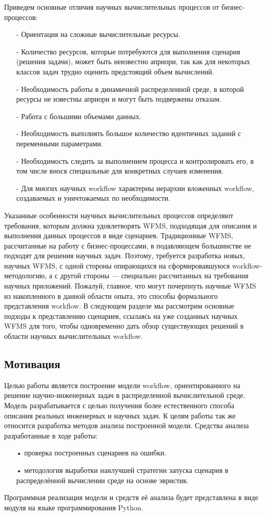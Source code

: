 \documentclass[koi8-r,usehyperref,12pt]{G7-32}
\begin{document}
Приведем основные отличия научных вычислительных процессов
от бизнес-процессов:
\begin{enumerate}
\item[-] Ориентация на сложные вычислительные ресурсы.
\item[-] Количество ресурсов, которые потребуются для выполнения сценария (решения задачи), может быть неизвестно априори, так как
для некоторых классов задач трудно оценить предстоящий объем
вычислений.
\item[-] Необходимость работы в динамичной распределенной среде, в которой ресурсы не известны априори и могут быть подвержены отказам.
\item[-] Работа с большими объемами данных.
\item[-] Необходимость выполнять большое количество идентичных заданий
с переменными параметрами.
\item[-] Необходимость следить за выполнением процесса и контролировать
его, в том числе внося специальные для конкретных случаев изменения.
\item[-]  Для многих научных workflow характерны иерархии вложенных workflow, создаваемых и уничтожаемых по необходимости.
\end{enumerate}

Указанные особенности научных вычислительных процессов определяют требования, которым должна удовлетворять WFMS, подходящая для
описания и выполнения данных процессов в виде сценариев. Традиционные WFMS, рассчитанные на работу с бизнес-процессами, в подавляющем большинстве не подходят для решения научных задач. Поэтому, требуется разработка новых, научных WFMS, с одной стороны опирающихся на сформировавшуюся workflow-методологию, а с другой стороны — специально рассчитанных на требования научных приложений.
Пожалуй, главное, что могут почерпнуть научные WFMS из накопленного в данной области опыта, это способы формального представления workflow. В следующем разделе мы рассмотрим основные подходы
к представлению сценариев, ссылаясь на уже созданных научных WFMS для того, чтобы одновременно дать обзор существующих
решений в области научных вычислительных workflow.


\subsection{Мотивация}
Целью работы является построение модели workflow, ориентированного  на решение научно-инженерных задач в распределенной вычислительной среде.
Модель разрабатывается с целью получения более естественного способа
описания реальных инженерных и научных задач. 
К целям работы так же относится разработка методов анализа построенной модели.
Средства анализа разработанные в ходе работы:
\begin{enumerate}
\item[•] проверка построенных сценариев на ошибки.
\item[•] методология выработки наилучшей стратегии запуска сценария в распределённой вычислении среде на основе эвристик.
\end{enumerate}
Программная реализация модели и средств её анализа будет представлена в виде модуля на языке программирования Python.
\end{document}
